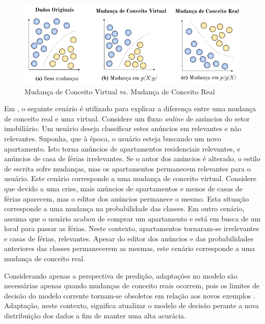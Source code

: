 \documentclass[qual, classic, a4paper]{ufbathesis}
\begin{document}
\begin{figure}[!ht]
\begin{center}
    \includegraphics[scale=0.8]{imagens/concept_drift.png}
    \caption{Mudança de Conceito Virtual vs. Mudança de Conceito Real}
    \label{fig:real_and_virtual_concept_drift}
\end{center}
\end{figure}

Em \cite{Gama:2014:SCD:2597757.2523813}, o seguinte cenário é utilizado para explicar a diferença entre uma mudança de conceito real e uma virtual.
Considere um fluxo \textit{online} de anúncios do setor imobiliário.
Um usuário deseja classificar estes anúncios em relevantes e não relevantes.
Suponha, que à época, o usuário esteja buscando um novo apartamento. 
Isto torna anúncios de apartamentos residenciais relevantes, e anúncios de casa de férias irrelevantes.
Se o autor dos anúncios é alterado, o estilo de escrita sofre mudanças, mas os apartamentos permanecem relevantes para o usuário.
Este cenário corresponde a uma mudança de conceito virtual.
Considere que devido a uma crise, mais anúncios de apartamentos e menos de casas de férias aparecem, mas o editor dos anúncios permanece o mesmo.
Esta situação corresponde a uma mudança na probabilidade das classes.
Em outro cenário, assuma que o usuário acabou de comprar um apartamento e está em busca de um local para passar as férias.
Neste contexto, apartamentos tornaram-se irrelevantes e casas de férias, relevantes.
Apesar do editor dos anúncios e das probabilidades anteriores das classes permanecerem as mesmas, este cenário corresponde a uma mudança de conceito real.

Considerando apenas a perspectiva de predição, adaptações no modelo são necessárias apenas quando mudanças de conceito reais ocorrem, 
pois os limites de decisão do modelo corrente tornam-se obsoletos em relação aos novos exemplos \cite{Gama:2014:SCD:2597757.2523813}.
Adaptação, neste contexto, significa atualizar o modelo de decisão perante a nova distribuição dos dados a fim de manter uma alta acurácia.
\end{document}
